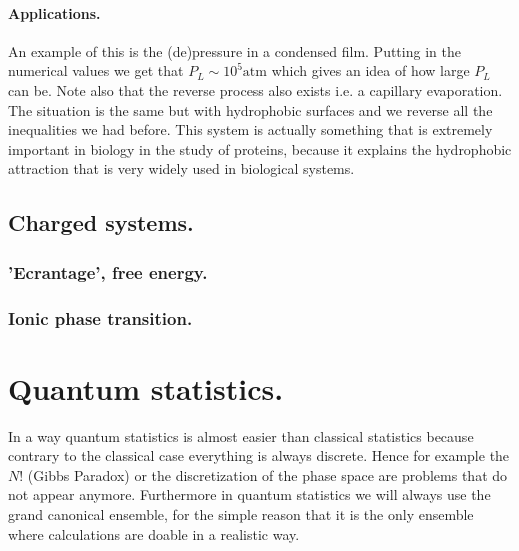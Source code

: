 \documentclass[10pt,a4paper]{book}
\begin{document}
\subsubsection{Applications.}
An example of this is the (de)pressure in a condensed film. Putting in the numerical values we get that $P_L \sim 10^5 \text{atm}$ which gives an idea of how large $P_L$ can be. Note also that the reverse process also exists i.e. a capillary evaporation. The situation is the same but with hydrophobic surfaces and we reverse all the inequalities we had before. This system is actually something that is extremely important in biology in the study of proteins, because it explains the hydrophobic attraction that is very widely used in biological systems.
\section{Charged systems.}
\subsection{'Ecrantage', free energy.}
\subsection{Ionic phase transition.}

\chapter{Quantum statistics.}
In a way quantum statistics is almost easier than classical statistics because contrary to the classical case everything is always discrete. Hence for example the $N!$ (Gibbs Paradox) or the discretization of the phase space are problems that do not appear anymore. Furthermore in quantum statistics we will always use the grand canonical ensemble, for the simple reason that it is the only ensemble where calculations are doable in a realistic way.
\end{document}
